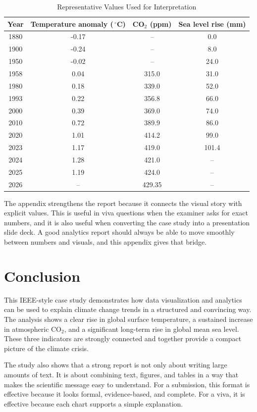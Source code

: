\documentclass[conference]{IEEEtran}
\begin{document}
\begin{table}[t]
\caption{Representative Values Used for Interpretation}
\centering
\begin{tabular}{c c c c}
\toprule
Year & Temperature anomaly (\,$^\circ$C) & CO$_2$ (ppm) & Sea level rise (mm) \\
\midrule
1880 & -0.17 & -- & 0.0 \\
1900 & -0.24 & -- & 8.0 \\
1950 & -0.02 & -- & 24.0 \\
1958 & 0.04 & 315.0 & 31.0 \\
1980 & 0.18 & 339.0 & 52.0 \\
1993 & 0.22 & 356.8 & 66.0 \\
2000 & 0.39 & 369.0 & 74.0 \\
2010 & 0.72 & 389.9 & 86.0 \\
2020 & 1.01 & 414.2 & 99.0 \\
2023 & 1.17 & 419.0 & 101.4 \\
2024 & 1.28 & 421.0 & -- \\
2025 & 1.19 & 424.0 & -- \\
2026 & -- & 429.35 & -- \\
\bottomrule
\end{tabular}
\end{table}

\noindent
The appendix strengthens the report because it connects the visual story with explicit values. This is useful in viva questions when the examiner asks for exact numbers, and it is also useful when converting the case study into a presentation slide deck. A good analytics report should always be able to move smoothly between numbers and visuals, and this appendix gives that bridge.


\section{Conclusion}
This IEEE-style case study demonstrates how data visualization and analytics can be used to explain climate change trends in a structured and convincing way. The analysis shows a clear rise in global surface temperature, a sustained increase in atmospheric CO$_2$, and a significant long-term rise in global mean sea level. These three indicators are strongly connected and together provide a compact picture of the climate crisis.

The study also shows that a strong report is not only about writing large amounts of text. It is about combining text, figures, and tables in a way that makes the scientific message easy to understand. For a submission, this format is effective because it looks formal, evidence-based, and complete. For a viva, it is effective because each chart supports a simple explanation.
\end{document}
